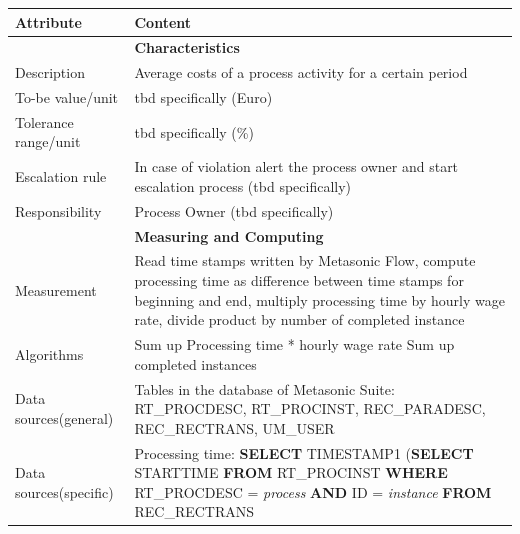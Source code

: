 \begin{table}[htbp]
	\centering
	\begin{tabular}{|p{3.0 cm } |p{10.0 cm }|}
		\hline
		\textbf{Attribute} & \textbf{Content}\\
		\hline
		\hline
		& \textbf{Characteristics}\\
		\hline
		Description & Average costs of a process activity for a certain period\\
		\hline
		To-be value/unit & tbd specifically (Euro)\\
		\hline
		Tolerance range/unit & tbd specifically (\%)\\
		\hline
		Escalation rule & In case of violation alert the process owner and start escalation process (tbd specifically)\\
		\hline
		Responsibility & Process Owner (tbd specifically)\\
		\hline
		\hline
		& \textbf{Measuring and Computing}\\
		\hline
		Measurement & Read time stamps written by Metasonic Flow, compute processing time as difference between time stamps for beginning and end, multiply processing time by hourly wage rate, divide product by number of completed instance\\
		\hline
		Algorithms & Sum up Processing time * hourly wage rate \newline
					Sum up completed instances\\
		\hline
		Data sources(general) & Tables in the database of Metasonic Suite:\newline
		RT\_PROCDESC, RT\_PROCINST, REC\_PARADESC, REC\_RECTRANS, UM\_USER\\
		\hline
		Data sources(specific) & Processing time:\newline
		\hspace*{4mm} \textbf{SELECT} TIMESTAMP1 \newline
		\hspace*{10mm} (\textbf{SELECT} STARTTIME \newline
		\hspace*{10mm} \textbf{FROM} RT\_PROCINST \newline
		\hspace*{10mm} \textbf{WHERE} RT\_PROCDESC = \textit{process} \newline
		\hspace*{10mm} \textbf{AND} ID = \textit{instance} \newline
		\hspace*{4mm}\textbf{FROM} REC\_RECTRANS \newline

\end{tabular}
\end{table}
